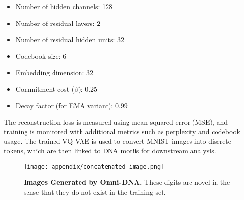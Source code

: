 \begin{itemize}
    \item Number of hidden channels: 128
    \item Number of residual layers: 2
    \item Number of residual hidden units: 32
    \item Codebook size: 6
    \item Embedding dimension: 32
    \item Commitment cost ($\beta$): 0.25
    \item Decay factor (for EMA variant): 0.99
\end{itemize}

The reconstruction loss is measured using mean squared error (MSE), and training is monitored with additional metrics such as perplexity and codebook usage. The trained VQ-VAE is used to convert MNIST images into discrete tokens, which are then linked to DNA motifs for downstream analysis.

 \begin{figure*}[ht!]
    \centering
    \texttt{[image: appendix/concatenated\_image.png]}
    \caption{\textbf{Images Generated by Omni-DNA.} These digits are novel in the sense that they do not exist in the training set.}
    \label{fig:mnist_sample}
\end{figure*}






